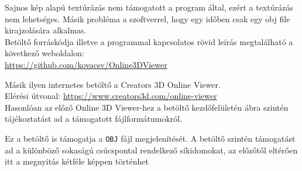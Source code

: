Sajnos kép alapú textúrázás nem támogatott a program által, ezért a textúrázás nem lehetséges. Másik probléma a szoftverrel, hogy egy időben csak egy obj file kirajzolására alkalmas.\\

Betöltő forráskódja illetve a programmal kapcsolatos rövid leírás megtalálható a következő weboldalon:\\
\url{https://github.com/kovacsv/Online3DViewer}
\newpage
{}

Másik ilyen internetes betöltő a Creators 3D Online Viewer.\cite{creators2018creators3d}\\
Elérési útvonal: \url{https://www.creators3d.com/online-viewer}\\

Hasonlóan az előző Online 3D Viewer-hez a betöltő kezdőfelületén  ábra szintén tájékoztatást ad a támogatott fájlformátumokról.

Ez a betöltő is támogatja a \texttt{OBJ} fájl megjelenítését. A betöltő szintén támogatást ad a különböző sokaságú csúcspontal rendelkező síkidomokat, az előzőtől eltérően itt a megnyitás kétféle képpen történhet

